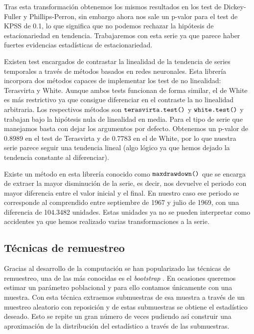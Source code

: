 Tras esta transformación obtenemos los mismos resultados en los test de Dickey-Fuller y Phillips-Perron, sin embargo ahora nos sale un p-valor para el test de KPSS de 0.1, lo que significa que no podemos rechazar la hipótesis de estacionariedad en tendencia. Trabajaremos con esta serie ya que parece haber fuertes evidencias estadísticas de estacionariedad.

Existen test encargados de contrastar la linealidad de la tendencia de series temporales a través de métodos basados en redes neuronales. Esta librería incorpora dos métodos capaces de implementar los test de no linealidad: Terasvirta y White. Aunque ambos tests funcionan de forma similar, el de White es más restrictivo ya que consigue diferenciar en el contraste la no linealidad arbitraria. Los respectivos métodos son $\verb!terasvirta.test()!$ y $\verb!white.test()!$ y trabajan bajo la hipótesis nula de linealidad en media. Para el tipo de serie que manejamos basta con dejar los argumentos por defecto. Obtenemos un p-valor de 0.8989 en el test de Terasvirta y de 0.7783 en el de White, por lo que nuestra serie parece seguir una tendencia lineal (algo lógico ya que hemos dejado la tendencia constante al diferenciar).

Existe un método en esta librería conocido como $\verb!maxdrawdown()!$ que se encarga de extraer la mayor disminución de la serie, es decir, nos devuelve el periodo con mayor diferencia entre el valor inicial y el final. En nuestro caso ese periodo se corresponde al comprendido entre septiembre de 1967 y julio de 1969, con una diferencia de 104.3482 unidades. Estas unidades ya no se pueden interpretar como accidentes ya que hemos realizado varias transformaciones a la serie.

\subsection{Técnicas de remuestreo}
Gracias al desarrollo de la computación se han popularizado las técnicas de remuestreo, una de las más conocidas es el \textit{bootstrap} \cite{efron_bootstrap_1979}. En ocasiones queremos estimar un parámetro poblacional y para ello contamos únicamente con una muestra. Con esta técnica extraemos submuestras de esa muestra a través de un muestreo aleatorio con reposición y de estas submuestras se obtiene el estadístico deseado. Esto se repite un gran número de veces pudiendo así construir una aproximación de la distribución del estadístico a través de las submuestras.

